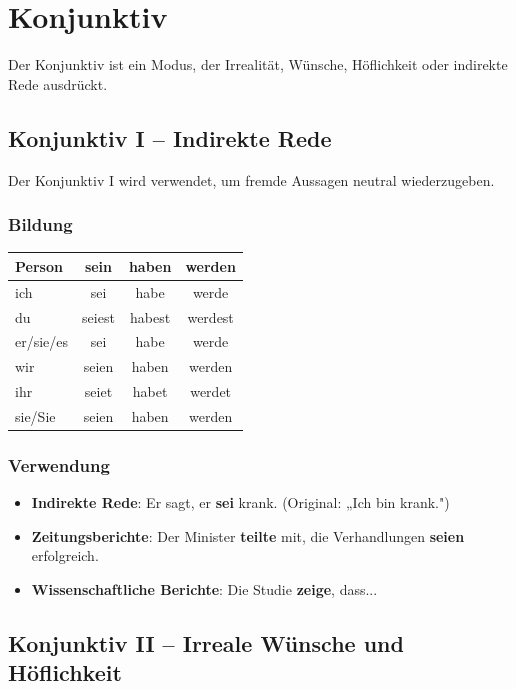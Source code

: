 \chapter{Konjunktiv}
\label{cha:Konjunktiv}

Der Konjunktiv ist ein Modus, der Irrealität, Wünsche, Höflichkeit oder indirekte Rede ausdrückt.

\section{Konjunktiv I – Indirekte Rede}
\label{sec:KonjunktivI}

Der Konjunktiv I wird verwendet, um fremde Aussagen neutral wiederzugeben.

\subsection{Bildung}
\begin{center}
\begin{tabular}{|l|c|c|c|}
\hline
\textbf{Person} & \textbf{sein} & \textbf{haben} & \textbf{werden} \\ \hline
ich & sei & habe & werde \\ \hline
du & seiest & habest & werdest \\ \hline
er/sie/es & sei & habe & werde \\ \hline
wir & seien & haben & werden \\ \hline
ihr & seiet & habet & werdet \\ \hline
sie/Sie & seien & haben & werden \\ \hline
\end{tabular}
\end{center}

\subsection{Verwendung}
\begin{itemize}
    \item \textbf{Indirekte Rede}: Er sagt, er \textbf{sei} krank. (Original: „Ich bin krank.")
    \item \textbf{Zeitungsberichte}: Der Minister \textbf{teilte} mit, die Verhandlungen \textbf{seien} erfolgreich.
    \item \textbf{Wissenschaftliche Berichte}: Die Studie \textbf{zeige}, dass...
\end{itemize}

\section{Konjunktiv II – Irreale Wünsche und Höflichkeit}
\label{sec:KonjunktivII}

